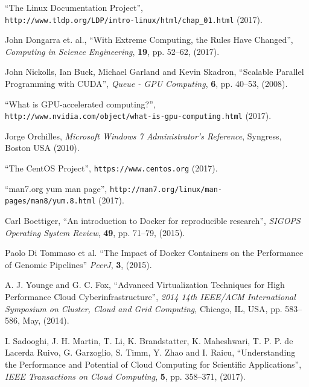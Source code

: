 \documentclass[twoside,a4paper,12pt,english]{inac17}
\begin{document}
\begin{thebibliography}{99} %

 ``The Linux Documentation Project'', \\\verb#http://www.tldp.org/LDP/intro-linux/html/chap_01.html# (2017).

 John Dongarra et. al., ``With Extreme Computing, the Rules Have Changed'', \textit{Computing in Science Engineering}, \textbf{19}, pp. 52--62, (2017).

 John Nickolls, Ian Buck, Michael Garland and Kevin Skadron, ``Scalable Parallel Programming with CUDA'', \textit{Queue - GPU Computing}, \textbf{6}, pp. 40--53, (2008).

 ``What is GPU-accelerated computing?'', \\\verb#http://www.nvidia.com/object/what-is-gpu-computing.html# (2017).

 Jorge Orchilles, \textit{Microsoft Windows 7 Administrator's Reference}, Syngress, Boston USA (2010).
  
 ``The CentOS Project'', \verb#https://www.centos.org# (2017).

 ``man7.org yum man page'', \verb#http://man7.org/linux/man-pages/man8/yum.8.html# (2017).
  
 Carl Boettiger, ``An introduction to Docker for reproducible research'', \textit{SIGOPS Operating System Review}, \textbf{49}, pp. 71--79, (2015).

 Paolo Di Tommaso et al. ``The Impact of Docker Containers on the Performance of Genomic Pipelines'' \textit{PeerJ}, \textbf{3}, (2015).

 A. J. Younge and G. C. Fox, ``Advanced Virtualization Techniques for High Performance Cloud Cyberinfrastructure'', \textit{2014 14th IEEE/ACM International Symposium on Cluster, Cloud and Grid Computing}, Chicago, IL, USA, pp. 583--586, May, (2014).
  
 I. Sadooghi, J. H. Martin, T. Li, K. Brandstatter, K. Maheshwari, T. P. P. de Lacerda Ruivo, G. Garzoglio, S. Timm, Y. Zhao and I. Raicu, ``Understanding the Performance and Potential of Cloud Computing for Scientific Applications'', \textit{IEEE Transactions on Cloud Computing}, \textbf{5}, pp. 358--371, (2017).
  

\end{thebibliography}
\end{document}
